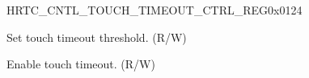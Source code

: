 \begin{register}{H}{RTC\_CNTL\_TOUCH\_TIMEOUT\_CTRL\_REG}{0x{}0124}\label{regdesc:RTCCNTLRTCTOUCHTIMEOUTCTRLREG}
%
%
%
\regnewline%
\begin{regdesc}\begin{reglist}
\label{fielddesc:RTCCNTLTOUCHTIMEOUTNUM}\item [RTC\_CNTL\_TOUCH\_TIMEOUT\_NUM] Set touch timeout threshold. (R/W)
\label{fielddesc:RTCCNTLTOUCHTIMEOUTEN}\item [RTC\_CNTL\_TOUCH\_TIMEOUT\_EN] Enable touch timeout. (R/W)
\end{reglist}\end{regdesc}
\end{register}

